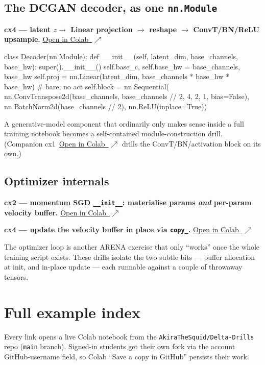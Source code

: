 \documentclass[11pt]{article}
\newcommand{\colab}[1]{\href{https://colab.research.google.com/github/AkiraTheSquid/Delta-Drills/blob/main/arena-procedural-drills/#1}{Open in Colab \,$\nearrow$}}
\begin{document}
\subsection{The DCGAN decoder, as one \texttt{nn.Module}}
\textbf{cx4 --- latent $z \to$ Linear projection $\to$ reshape $\to$ ConvT/BN/ReLU upsample.} \;\colab{composites/part5/004-latent-projection-then-convt-block.ipynb}

\begin{code}
class Decoder(nn.Module):
    def __init__(self, latent_dim, base_channels, base_hw):
        super().__init__()
        self.base_c, self.base_hw = base_channels, base_hw
        self.proj = nn.Linear(latent_dim, base_channels * base_hw * base_hw)  # bare, no act
        self.block = nn.Sequential(
            nn.ConvTranspose2d(base_channels, base_channels // 2, 4, 2, 1, bias=False),
            nn.BatchNorm2d(base_channels // 2),
            nn.ReLU(inplace=True))
\end{code}

A generative-model component that ordinarily only makes sense inside a full training notebook
becomes a self-contained module-construction drill. (Companion cx1
\,\colab{composites/part5/001-dcgan-g-block-as-nn-module-subclass.ipynb} drills the
ConvT/BN/activation block on its own.)

\subsection{Optimizer internals}
\textbf{cx2 --- momentum SGD \texttt{\_\_init\_\_}: materialise params \emph{and} per-param velocity buffer.} \;\colab{composites/part3/002-sgd-init-with-velocity-buffers.ipynb}

\textbf{cx4 --- update the velocity buffer in place via \texttt{copy\_}.} \;\colab{composites/part3/004-velocity-buffer-update-via-copy.ipynb}

The optimizer loop is another ARENA exercise that only ``works'' once the whole training script
exists. These drills isolate the two subtle bits --- buffer allocation at init, and in-place
update --- each runnable against a couple of throwaway tensors.

\section{Full example index}

Every link opens a live Colab notebook from the \texttt{AkiraTheSquid/Delta-Drills} repo
(\texttt{main} branch). Signed-in students get their own fork via the account GitHub-username
field, so Colab ``Save a copy in GitHub'' persists their work.
\end{document}
